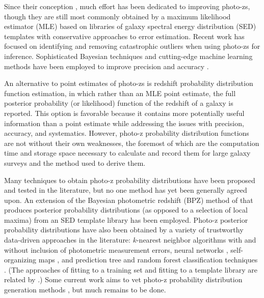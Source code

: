 \documentclass[preprint]{aastex}
\begin{document}
Since their conception \citep{Baum1962}, much effort has been dedicated to 
improving photo-zs, though they are still most commonly obtained by a maximum 
likelihood estimator (MLE) based on libraries of galaxy spectral energy 
distribution (SED) templates with conservative approaches to error estimation.  
Recent work has focused on identifying and removing catastrophic outliers when 
using photo-zs for inference.  \citep{Gorecki2014}  Sophisticated Bayesian 
techniques and cutting-edge machine learning methods have been employed to 
improve precision \citep{Carliles2010} and accuracy \citep{Sadeh2015}. 

An alternative to point estimates of photo-zs is redshift probability 
distribution function estimation, in which rather than an MLE point estimate, 
the full posterior probability (or likelihood) function of the redshift of a 
galaxy is reported.  \citep{Koo1999}  This option is favorable because it 
contains more potentially useful information than a point estimate while 
addressing the issues with precision, accuracy, and systematics.  However, 
photo-z probability distribution functions are not without their own 
weaknesses, the foremost of which are the computation time and storage space 
necessary to calculate and record them for large galaxy surveys 
\citep{CarrascoKind2014} and the method used to derive them.

Many techniques to obtain photo-z probability distributions have been proposed 
and tested in the literature, but no one method has yet been generally agreed 
upon.  An extension of the Bayesian photometric redshift (BPZ) method of 
\citet{Benitez2000} that produces posterior probability distributions (as 
opposed to a selection of local maxima) from an SED template library has been 
employed.  \citep{Hildebrandt2012, Kelly2014, Lopez-Sanjuan2015}  Photo-z 
posterior probability distributions have also been obtained by a variety of 
trustworthy data-driven approaches in the literature: $k$-nearest neighbor 
algorithms with \citep{Ball2008} and without \citep{Sheldon2012} inclusion of 
photometric measurement errors, neural networks \citep{Bonnett2015a}, 
self-organizing maps \citep{CarrascoKind2014a}, and prediction tree and random 
forest classification techniques \citep{Carliles2010, CarrascoKind2013}.  (The 
approaches of fitting to a training set and fitting to a template library are 
related by \citet{Budavari2009}.)  Some current work aims to vet photo-z 
probability distribution generation methods \citep{Wittman2016}, but much 
remains to be done.
\end{document}
